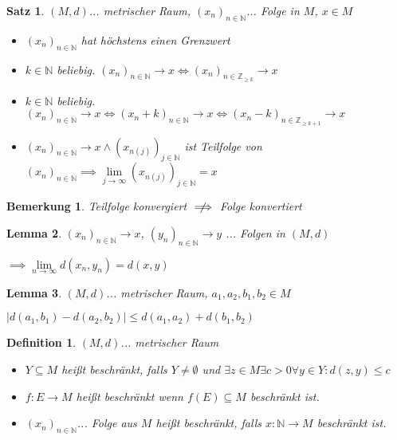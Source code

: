 \documentclass[twocolumn]{article}
\newtheorem{theorem}{Satz}[section]
\newtheorem{lemma}[theorem]{Lemma}
\newtheorem{definition}{Definition}[section]
\newtheorem*{remark}{Bemerkung}
\newcommand*{\logeq}{\Leftrightarrow}
\begin{document}
\begin{theorem}
	$(M,d)$... metrischer Raum, $(x_{n})_{n \in \mathbb{N}}$... Folge in $M$, $x \in M$
	
	\begin{itemize}
		\item $(x_{n})_{n \in \mathbb{N}}$ hat höchstens einen Grenzwert
		\item $k \in \mathbb{N}$ beliebig. $(x_{n})_{n \in \mathbb{N}}\rightarrow x \logeq (x_{n})_{n \in \mathbb{Z}_{\geq k}}\rightarrow x$
		\item $k \in \mathbb{N}$ beliebig. $(x_{n})_{n \in \mathbb{N}}\rightarrow x \logeq (x_{n}+k)_{n \in \mathbb{N}}\rightarrow x \logeq (x_{n}-k)_{n \in \mathbb{Z}_{\geq k+1}}\rightarrow x$
		\item $(x_{n})_{n \in \mathbb{N}}\rightarrow x \land (x_{n(j)})_{j \in \mathbb{N}}$ ist Teilfolge von $(x_{n})_{n \in \mathbb{N}} \implies \lim\limits_{j\rightarrow \infty}(x_{n(j)})_{j \in \mathbb{N}}=x$
	\end{itemize}
\end{theorem}

\begin{remark}
	Teilfolge konvergiert $\centernot\implies$ Folge konvertiert
\end{remark}

\begin{lemma}
	$(x_{n})_{n \in \mathbb{N}}\rightarrow x$, $(y_{n})_{n \in \mathbb{N}}\rightarrow y$ ... Folgen in $(M,d)$
	
	$\implies \lim\limits_{n\rightarrow \infty}d(x_{n},y_{n})=d(x,y)$
\end{lemma}

\begin{lemma}
	$(M,d)$... metrischer Raum, $a_{1},a_{2},b_{1},b_{2} \in M$
	
	$|d(a_{1},b_{1})-d(a_{2},b_{2})|\leq d(a_{1},a_{2})+d(b_{1},b_{2})$
\end{lemma}

\begin{definition}
	$(M,d)$... metrischer Raum
	
	\begin{itemize}
		\item $Y \subseteq M$ heißt beschränkt, falls $Y \neq \emptyset$ und $\exists z \in M \exists c > 0 \forall y \in Y : d(z,y)\leq c$
		\item $f:E\rightarrow M$ heißt beschränkt wenn $f(E)\subseteq M$ beschränkt ist.
		\item $(x_n)_{n \in \mathbb{N}}$... Folge aus $M$ heißt beschränkt, falls $x:\mathbb{N}\rightarrow M$ beschränkt ist.
	\end{itemize}
\end{definition}
\end{document}
